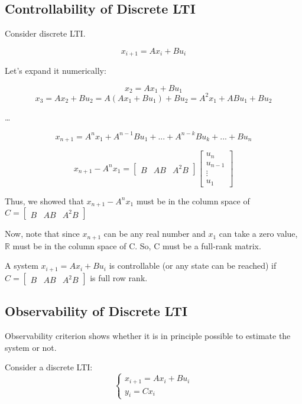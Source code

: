 \subsection{Controllability of Discrete LTI}
Consider discrete LTI.

\[x_{i+1} = Ax_i + Bu_i\]

Let's expand it numerically:

\[x_2 = Ax_1 + Bu_1\]
\[x_3 = Ax_2 + Bu_2 = A(Ax_1 + Bu_1) + Bu_2 = A^{2}x_1 + ABu_1 + Bu_2\]

\begin{center}
    \dots
\end{center}

\[x_{n+1} = A^{n}x_1 + A^{n-1}Bu_1 + ... + A^{n-k}Bu_k +...+ Bu_n\]


\[
x_{n+1} - A^{n}x_1 = \begin{bmatrix} B & AB & A^2B \end{bmatrix} \begin{bmatrix} u_n \\ u_{n-1} \\ \vdots \\ u_1 \end{bmatrix}
\]

Thus, we showed that $x_{n+1} - A^{n}x_1$ must be in the column space of $C = \begin{bmatrix} B & AB & A^2B \end{bmatrix}$

Now, note that since \( x_{n+1} \) can be any real number and \( x_1 \) can take a zero value, \( \mathbb{R} \) must be in the column space of C.
So, C must be a full-rank matrix. 


\begin{tcolorbox}[colback=green!10,colframe=green!50!black,title=\textbf{Controllability}]
    A system $x_{i+1} = Ax_i + Bu_i$ is controllable (or any state can be reached) if $C = \begin{bmatrix} B & AB & A^2B \end{bmatrix}$
    is full row rank.
\end{tcolorbox}


\subsection{Observability of Discrete LTI}

Observability criterion shows whether it is in principle possible to estimate the system or not. 


Consider a discrete LTI:
\[
\begin{cases}
    x_{i+1} = Ax_i + Bu_i \\
    y_i = Cx_i
\end{cases}
\]

